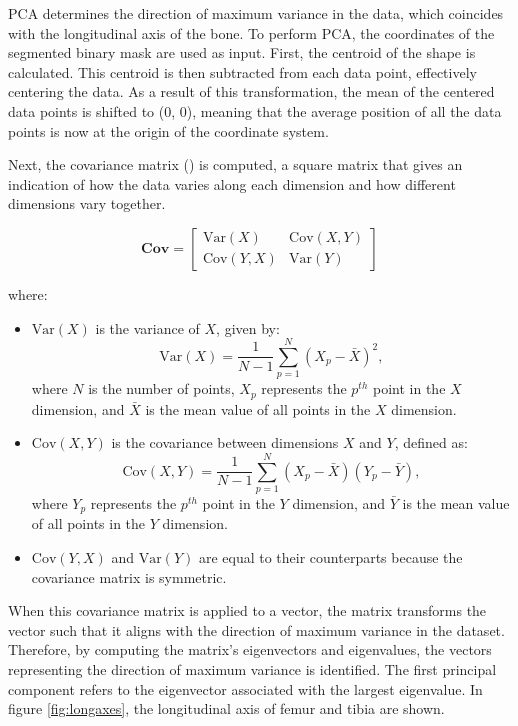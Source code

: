 \documentclass{micro-econ-thesis}
\begin{document}
PCA determines the direction of maximum variance in the data, which coincides with the longitudinal axis of the bone. To perform PCA, the coordinates of the segmented binary mask are used as input. First, the centroid of the shape is calculated. This centroid is then subtracted from each data point, effectively centering the data. As a result of this transformation, the mean of the centered data points is shifted to (0, 0), meaning that the average position of all the data points is now at the origin of the coordinate system. 

Next, the covariance matrix () is computed, a square matrix that gives an indication of how the data varies along each dimension and how different dimensions vary together. 

\begin{equation}
	\mathbf{Cov} = 
	\begin{bmatrix}
		\mathrm{Var}(X) & \mathrm{Cov}(X,Y) \\
		\mathrm{Cov}(Y,X) & \mathrm{Var}(Y)
	\end{bmatrix}
	\label{eq:cov}
\end{equation}

where:
\begin{itemize}
	\item \(\mathrm{Var}(X)\) is the variance of \(X\), given by:
	\[
	\mathrm{Var}(X) = \frac{1}{N-1} \sum_{p=1}^{N} (X_{p} - \bar{X})^2,
	\]
	where \(N\) is the number of points, \(X_{p}\) represents the \(p^{th}\) point in the \(X\) dimension, and \(\bar{X}\) is the mean value of all points in the \(X\) dimension. 
	\item \(\mathrm{Cov}(X,Y)\) is the covariance between dimensions \(X\) and \(Y\), defined as:
	\[
	\mathrm{Cov}(X,Y) = \frac{1}{N-1} \sum_{p=1}^{N} (X_{p} - \bar{X})(Y_{p} - \bar{Y}),
	\]
	where \(Y_{p}\) represents the \(p^{th}\) point in the \(Y\) dimension, and \(\bar{Y}\) is the mean value of all points in the \(Y\) dimension.
	
	\item \(\mathrm{Cov}(Y,X)\) and  \(\mathrm{Var}(Y)\) are equal to their counterparts because the covariance matrix is symmetric. 

\end{itemize}


When this covariance matrix is applied to a vector, the matrix transforms the vector such that it aligns with the direction of maximum variance in the dataset. Therefore, by computing the matrix's eigenvectors and eigenvalues, the vectors representing the direction of maximum variance is identified. The first principal component refers to the eigenvector associated with the largest eigenvalue. In figure \ref{fig:longaxes}, the longitudinal axis of femur and tibia are shown. 
\end{document}
